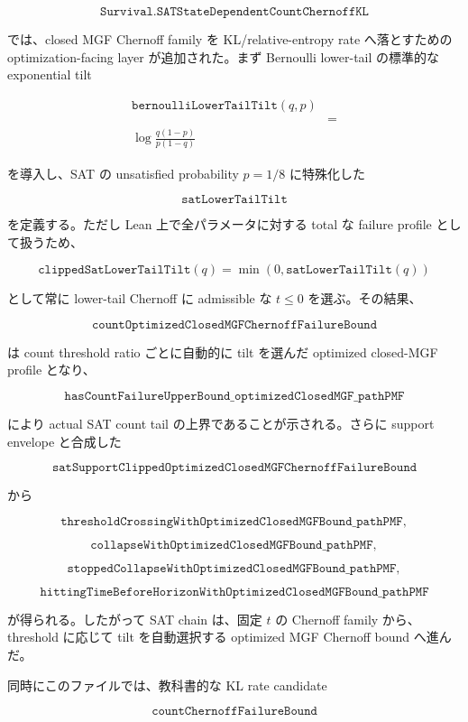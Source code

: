 \documentclass[12pt,a4paper]{article}
\begin{document}
\[
\texttt{Survival.SATStateDependentCountChernoffKL}
\]

では、closed MGF Chernoff family を KL/relative-entropy rate へ落とすための optimization-facing layer が追加された。まず Bernoulli lower-tail の標準的な exponential tilt

\[
\begin{aligned}
\texttt{bernoulliLowerTailTilt}(q,p) \\
&= \\
\log\frac{q(1-p)}{p(1-q)}
\end{aligned}
\]

を導入し、SAT の unsatisfied probability \(p=1/8\) に特殊化した

\[
\texttt{satLowerTailTilt}
\]

を定義する。ただし Lean 上で全パラメータに対する total な failure profile として扱うため、

\[
\texttt{clippedSatLowerTailTilt}(q)=\min(0,\texttt{satLowerTailTilt}(q))
\]

として常に lower-tail Chernoff に admissible な \(t\le 0\) を選ぶ。その結果、

\[
\texttt{countOptimizedClosedMGFChernoffFailureBound}
\]

は count threshold ratio ごとに自動的に tilt を選んだ optimized closed-MGF profile となり、

\[
\texttt{hasCountFailureUpperBound\_optimizedClosedMGF\_pathPMF}
\]

により actual SAT count tail の上界であることが示される。さらに support envelope と合成した

\[
\texttt{satSupportClippedOptimizedClosedMGFChernoffFailureBound}
\]

から

\[
\texttt{thresholdCrossingWithOptimizedClosedMGFBound\_pathPMF},
\]

\[
\texttt{collapseWithOptimizedClosedMGFBound\_pathPMF},
\]

\[
\texttt{stoppedCollapseWithOptimizedClosedMGFBound\_pathPMF},
\]

\[
\texttt{hittingTimeBeforeHorizonWithOptimizedClosedMGFBound\_pathPMF}
\]

が得られる。したがって SAT chain は、固定 \(t\) の Chernoff family から、threshold に応じて tilt を自動選択する optimized MGF Chernoff bound へ進んだ。

同時にこのファイルでは、教科書的な KL rate candidate

\[
\texttt{countChernoffFailureBound}
\]
\end{document}
